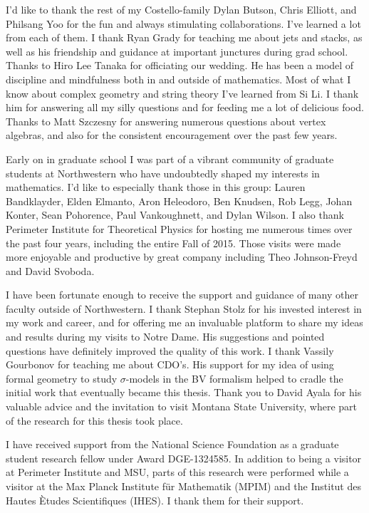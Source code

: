 I'd like to thank the rest of my Costello-family Dylan Butson, Chris Elliott, and Philsang Yoo for the fun and always stimulating collaborations. 
I've learned a lot from each of them. 
I thank Ryan Grady for teaching me about jets and stacks, as well as his friendship and guidance at important junctures during grad school. 
Thanks to Hiro Lee Tanaka for officiating our wedding.
He has been a model of discipline and mindfulness both in and outside of mathematics.
Most of what I know about complex geometry and string theory I've learned from Si Li. 
I thank him for answering all my silly questions and for feeding me a lot of delicious food. 
Thanks to Matt Szczesny for answering numerous questions about vertex algebras, and also for the consistent encouragement over the past few years. 

Early on in graduate school I was part of a vibrant community of graduate students at Northwestern who have undoubtedly shaped my interests in mathematics.
I'd like to especially thank those in this group: Lauren Bandklayder, Elden Elmanto, Aron Heleodoro, Ben Knudsen, Rob Legg, Johan Konter, Sean Pohorence, Paul Vankoughnett, and Dylan Wilson.
I also thank Perimeter Institute for Theoretical Physics for hosting me numerous times over the past four years, including the entire Fall of 2015. 
Those visits were made more enjoyable and productive by great company including Theo Johnson-Freyd and David Svoboda. 

I have been fortunate enough to receive the support and guidance of many other faculty outside of Northwestern. 
I thank Stephan Stolz for his invested interest in my work and career, and for offering me an invaluable platform to share my ideas and results during my visits to Notre Dame. 
His suggestions and pointed questions have definitely improved the quality of this work. 
I thank Vassily Gourbonov for teaching me about CDO's.
His support for my idea of using formal geometry to study $\sigma$-models in the BV formalism helped to cradle the initial work that eventually became this thesis.
Thank you to David Ayala for his valuable advice and the invitation to visit Montana State University, where part of the research for this thesis took place.

I have received support from the National Science Foundation as a graduate student research fellow under Award DGE-1324585.
In addition to being a visitor at Perimeter Institute and MSU, parts of this research were performed while a visitor at the Max Planck Institute f\"{u}r Mathematik
(MPIM) and the Institut des Hautes \`{E}tudes Scientifiques (IHES). 
I thank them for their support. 

